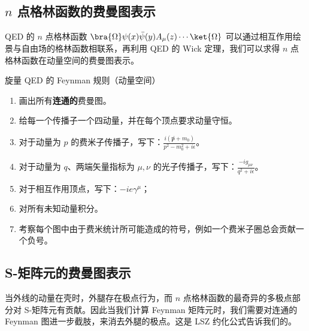 
\subsection{$n$ 点格林函数的费曼图表示}
QED 的 $n$ 点格林函数 $\bra{\Omega} \psi(x)\bar\psi(y)A_\mu(z) \cdots \ket{\Omega}$ 可以通过相互作用绘景与自由场的格林函数相联系，再利用 QED 的 Wick 定理，我们可以求得 $n$ 点格林函数在动量空间的费曼图表示。
\begin{theorem}{旋量 QED 的 Feynman 规则（动量空间）}

\begin{enumerate}
\item 画出所有\textbf{连通的}费曼图。
\item 给每一个传播子一个四动量，并在每个顶点要求动量守恒。
\item 对于动量为 $p$ 的费米子传播子，写下：$\frac{i(\not p+m_0)}{p^2-m_0^2 + i\epsilon}$。
\item 对于动量为 $q$、两端矢量指标为 $\mu,\nu$ 的光子传播子，写下：$\frac{-ig_{\mu\nu}}{q^2 + i\epsilon}$。
\item 对于相互作用顶点，写下：$-ie\gamma^\mu$；
\item 
对所有未知动量积分。
\item 
考察每个图中由于费米统计所可能造成的符号，例如一个费米子圈总会贡献一个负号。
\end{enumerate}
\end{theorem}

\subsection{S-矩阵元的费曼图表示}

当外线的动量在壳时，外腿存在极点行为，而 $n$ 点格林函数的最奇异的多极点部分对 S-矩阵元有贡献。因此当我们计算 Feynman 矩阵元时，我们需要对连通的 Feynman 图进一步截肢，来消去外腿的极点。这是 LSZ 约化公式告诉我们的。

